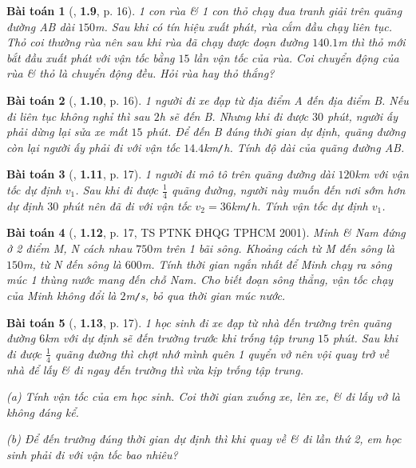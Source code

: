 \documentclass{article}
\numberwithin{equation}{section}
\newtheorem{baitoan}{Bài toán}[section]
\begin{document}
\begin{baitoan}[\cite{Thinh_Lua2021}, \textbf{1.9}, p. 16]
	1 con rùa \& 1 con thỏ chạy đua tranh giải trên quãng đường AB dài $150$\emph{m}. Sau khi có tín hiệu xuất phát, rùa cắm đầu chạy liên tục. Thỏ coi thường rùa nên sau khi rùa đã chạy được đoạn đường $140.1$\emph{m} thì thỏ mới bắt đầu xuất phát với vận tốc bằng $15$ lần vận tốc của rùa. Coi chuyển động của rùa \& thỏ là chuyển động đều. Hỏi rùa hay thỏ thắng?
\end{baitoan}

\begin{baitoan}[\cite{Thinh_Lua2021}, \textbf{1.10}, p. 16]
	1 người đi xe đạp từ địa điểm A đến địa điểm B. Nếu đi liên tục không nghỉ thì sau $2$\emph{h} sẽ đến B. Nhưng khi đi được $30$ phút, người ấy phải dừng lại sửa xe mất $15$ phút. Để đến B đúng thời gian dự định, quãng đường còn lại người ấy phải đi với vận tốc $14.4$\emph{km\texttt{/}h}. Tính độ dài của quãng đường AB.
\end{baitoan}

\begin{baitoan}[\cite{Thinh_Lua2021}, \textbf{1.11}, p. 17]
	1 người đi mô tô trên quãng đường dài $120$\emph{km} với vận tốc dự định $v_1$. Sau khi đi được $\frac{1}{4}$ quãng đường, người này muốn đến nơi sớm hơn dự định $30$ phút nên đã đi với vận tốc $v_2 = 36$\emph{km\texttt{/}h}. Tính vận tốc dự định $v_1$.
\end{baitoan}

\begin{baitoan}[\cite{Thinh_Lua2021}, \textbf{1.12}, p. 17, TS PTNK ĐHQG TPHCM 2001]
	Minh \& Nam đứng ở 2 điểm M, N cách nhau $750$\emph{m} trên 1 bãi sông. Khoảng cách từ M đến sông là $150$\emph{m}, từ N đến sông là $600$\emph{m}. Tính thời gian ngắn nhất để Minh chạy ra sông múc 1 thùng nước mang đến chỗ Nam. Cho biết đoạn sông thẳng, vận tốc chạy của Minh không đổi là $2$\emph{m\texttt{/}s}, bỏ qua thời gian múc nước.
\end{baitoan}

\begin{baitoan}[\cite{Thinh_Lua2021}, \textbf{1.13}, p. 17]
	1 học sinh đi xe đạp từ nhà đến trường trên quãng đường $6$\emph{km} với dự định sẽ đến trường trước khi trống tập trung $15$ phút. Sau khi đi được $\frac{1}{4}$ quãng đường thì chợt nhớ mình quên 1 quyển vở nên vội quay trở về nhà để lấy \& đi ngay đến trường thì vừa kịp trống tập trung.
	\begin{enumerate*}
		\item[(a)] Tính vận tốc của em học sinh. Coi thời gian xuống xe, lên xe, \& đi lấy vở là không đáng kể.
		\item[(b)] Để đến trường đúng thời gian dự định thì khi quay về \& đi lần thứ 2, em học sinh phải đi với vận tốc bao nhiêu?
	\end{enumerate*}
\end{baitoan}
\end{document}
